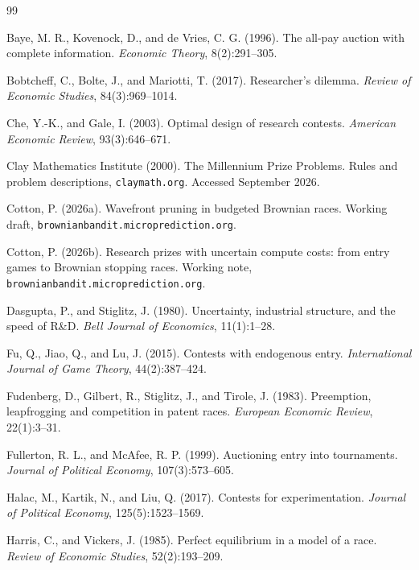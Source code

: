 \documentclass[11pt]{article}
\theoremstyle{itheads}
\begin{document}
\begin{thebibliography}{99}

Baye, M. R., Kovenock, D., and de Vries, C. G. (1996).
The all-pay auction with complete information.
\emph{Economic Theory}, 8(2):291--305.

Bobtcheff, C., Bolte, J., and Mariotti, T. (2017).
Researcher's dilemma.
\emph{Review of Economic Studies}, 84(3):969--1014.

Che, Y.-K., and Gale, I. (2003).
Optimal design of research contests.
\emph{American Economic Review}, 93(3):646--671.

Clay Mathematics Institute (2000).
The Millennium Prize Problems.
Rules and problem descriptions, \texttt{claymath.org}.
Accessed September 2026.

Cotton, P. (2026a).
Wavefront pruning in budgeted Brownian races.
Working draft, \texttt{brownianbandit.microprediction.org}.

Cotton, P. (2026b).
Research prizes with uncertain compute costs: from entry games to
Brownian stopping races.
Working note, \texttt{brownianbandit.microprediction.org}.

Dasgupta, P., and Stiglitz, J. (1980).
Uncertainty, industrial structure, and the speed of R\&D.
\emph{Bell Journal of Economics}, 11(1):1--28.

Fu, Q., Jiao, Q., and Lu, J. (2015).
Contests with endogenous entry.
\emph{International Journal of Game Theory}, 44(2):387--424.

Fudenberg, D., Gilbert, R., Stiglitz, J., and Tirole, J. (1983).
Preemption, leapfrogging and competition in patent races.
\emph{European Economic Review}, 22(1):3--31.

Fullerton, R. L., and McAfee, R. P. (1999).
Auctioning entry into tournaments.
\emph{Journal of Political Economy}, 107(3):573--605.

Halac, M., Kartik, N., and Liu, Q. (2017).
Contests for experimentation.
\emph{Journal of Political Economy}, 125(5):1523--1569.

Harris, C., and Vickers, J. (1985).
Perfect equilibrium in a model of a race.
\emph{Review of Economic Studies}, 52(2):193--209.


\end{thebibliography}
\end{document}

